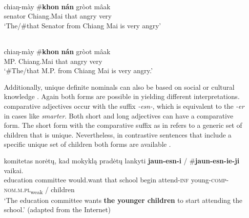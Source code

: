 \documentclass[output=paper,
modfonts
]{langscibook}
\begin{document}
\begin{exe}
	\ex \label{ex:sereikaite:48}
	 \citep[107]{Jenks2015} \\
	 {chiaŋ-mày} {\op}\textnormal{\#}\textbf{khon} \textbf{nán}{\cp} {gròot} {mâak}\\
	senator Chiang.Mai  {that} angry very\\
	\trans `The/\#that Senator from Chiang Mai is very angry' 
\end{exe}

\begin{exe}
	\ex \label{ex:sereikaite:49}
	 \citep[107]{Jenks2015} \\
	 {chiaŋ-m\`ay} \textnormal{\#}{\op}\textbf{khon} \textbf{nán}{\cp} {gròot} {mâak}\\
	MP. Chiang.Mai  {that} angry very\\
	\trans `\#The/that M.P. from Chiang Mai is very angry.' 
\end{exe}

Additionally, unique definite nominals can also be based on social or cultural knowledge \citep{Hawkins1978}. Again both forms are possible in  yielding different interpretations.  comparative adjectives occur with the suffix \textit{-esn-}, which is equivalent to the  \textit{-er} in cases like \textit{smarter}. Both short and long adjectives can have a comparative form. The short form with the comparative suffix as in  refers to a generic set of children that is unique. Nevertheless, in contrastive sentences that include a specific unique set of children both forms are available . 
 
\begin{exe}
	\ex \label{ex:sereikaite:50}
	 {komitetas} {norėtų}, {kad} {mokyklą} {pradėtų} {lankyti} \textbf{jaun-esn-i} \textnormal{/} \textnormal{\#}\textbf{jaun-esn-ie-ji} {vaikai}.\\
	education committee would.want that school begin attend-\textsc{inf} {young-\textsc{comp}-\textsc{nom.m.pl}\textsubscript{weak}} /  children\\
	\trans `The education committee wants \textbf{the younger children} to start attending the school.' (adapted from the Internet)
\end{exe}
\end{document}
